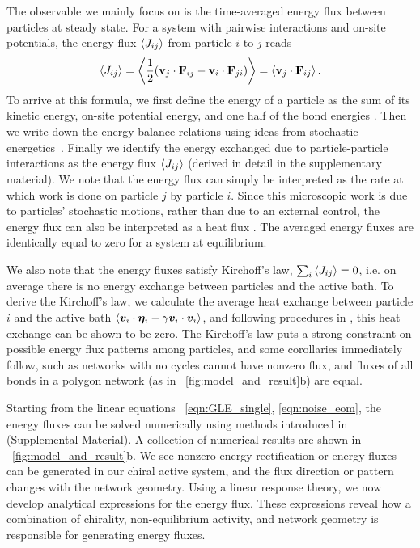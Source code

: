 \documentclass[
 preprint,
 preprintnumbers,
 amsmath,amssymb,
 aps,
 pre,
 longbibliography,
 superscriptaddress,
 10pt, twocolumn
]{revtex4-1}
\begin{document}
The observable we mainly focus on is the time-averaged energy flux between particles at steady state. For a system with pairwise interactions and on-site potentials, the energy flux $\expval{J_{ij}}$ from particle $i$ to $j$ reads
\begin{equation} \label{eqn:flux_def}
    \expval{J_{ij}} = \expval{\frac{1}{2} (\mathbf{v}_j \cdot \mathbf{F}_{ij} - \mathbf{v}_i \cdot \mathbf{F}_{ji})}
    = \expval{\mathbf{v}_j \cdot \mathbf{F}_{ij}}.
\end{equation}
To arrive at this formula, we first define the energy of a particle as the sum of its kinetic energy, on-site potential energy, and one half of the bond energies \cite{Lepri2003ThermalConduction}. Then we write down the energy balance relations using ideas from stochastic energetics~\cite{Sekimoto1998LangevinEquation}. Finally we identify the energy exchanged due to particle-particle interactions as the energy flux $\expval{J_{ij}}$ (derived in detail in the supplementary material).
We note that the energy flux can simply be interpreted as the rate at which work is done on particle $j$ by particle $i$.
Since this microscopic work is due to particles' stochastic motions, rather than due to an external control, the energy flux can also be interpreted as a heat flux \cite{Sekimoto1998LangevinEquation,Lepri2003ThermalConduction}. The averaged energy fluxes are identically equal to zero for a system at equilibrium. 

We also note that the energy fluxes satisfy Kirchoff's law, $\sum_i \expval{J_{ij}} = 0$, i.e. on average there is no energy exchange between particles and the active bath. To derive the Kirchoff's law, we calculate the average heat exchange between particle $i$ and the active bath $\expval{\bm{v}_i \cdot \bm{\eta}_i - \gamma \bm{v}_i \cdot \bm{v}_i}$, and following procedures in \cite{Kundu2011LargeDeviations}, this heat exchange can be shown to be zero.
The Kirchoff's law puts a strong constraint on possible energy flux patterns among particles, and some corollaries immediately follow, such as networks with no cycles cannot have nonzero flux, and fluxes of all bonds in a polygon network (as in \figurename~\ref{fig:model_and_result}b) are equal.

Starting from the linear equations \eqnname~\eqref{eqn:GLE_single}, \eqref{eqn:noise_eom}, the energy fluxes can be solved numerically using methods introduced in \cite{Gardiner2009ItoCalculus,Ceriotti2010ColoredNoiseThermostats} (Supplemental Material).
A collection of numerical results are shown in \figurename~\ref{fig:model_and_result}b. We see nonzero energy rectification or energy fluxes can be generated in our chiral active system, and the flux direction or pattern changes with the network geometry.
Using a linear response theory, we now develop analytical expressions for the energy flux. These expressions reveal how a combination of chirality, non-equilibrium activity, and network geometry is responsible for generating energy fluxes.
\end{document}
